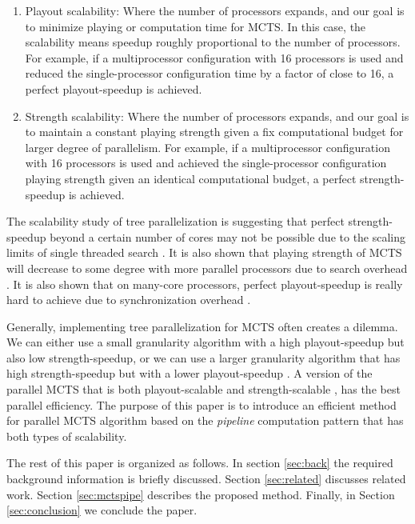 \documentclass[10pt, conference, compsocconf]{IEEEtran}
\begin{document}
\begin{enumerate}

\item Playout scalability: Where the number of processors expands, and our goal is to minimize playing or computation time for MCTS. In this case, the scalability means speedup roughly proportional to the number of processors. For example, if a multiprocessor configuration with 16 processors is used and reduced the single-processor configuration time by a factor of close to 16, a perfect playout-speedup is achieved. 

\item Strength scalability: Where the number of processors expands, and our goal is to maintain a constant playing strength given a fix computational budget for larger degree of parallelism. For example, if a multiprocessor configuration with 16 processors is used and achieved the single-processor configuration playing strength given an identical computational budget, a perfect strength-speedup is achieved.  

\end{enumerate}

The scalability study of tree parallelization is suggesting that perfect strength-speedup beyond a certain number of cores may not be possible due to the scaling limits of single threaded search \cite{Segal:2010:SPU:1950322.1950326}. It is also shown that playing strength of MCTS will decrease to some degree with more parallel processors due to search overhead \cite{Kuipers2013a}. It is also shown that on many-core processors, perfect playout-speedup is really hard to achieve due to synchronization overhead \cite{Mirsoleimani2015a}.
 
Generally, implementing tree parallelization for MCTS often creates a dilemma. We can either use a small granularity algorithm with a high playout-speedup but also low strength-speedup, or we can use a larger granularity algorithm that has high strength-speedup but with a lower playout-speedup \cite{Mirsoleimani2015,Kuipers2013a}. A version of the parallel MCTS that is both playout-scalable and strength-scalable , has the best parallel efficiency. The purpose of this paper is to introduce an efficient method for parallel MCTS algorithm based on the \textit{pipeline} computation pattern that has both types of scalability.


The rest of this paper is organized as follows. In section \ref{sec:back} the
required background information is briefly discussed. Section \ref{sec:related} discusses related work. Section \ref{sec:mctspipe} describes the proposed method. Finally, in Section \ref{sec:conclusion} we conclude the paper.
\end{document}
